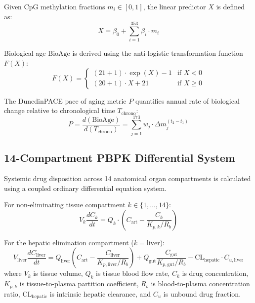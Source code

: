 \documentclass[10pt,journal,compsoc]{IEEEtran}
\begin{document}
Given CpG methylation fractions $m_i \in [0, 1]$, the linear predictor $X$ is defined as:
\begin{equation}
X = \beta_0 + \sum_{i=1}^{353} \beta_i \cdot m_i
\end{equation}

Biological age $\text{BioAge}$ is derived using the anti-logistic transformation function $F(X)$:
\begin{equation}
F(X) = \begin{cases} 
(21 + 1) \cdot \exp(X) - 1 & \text{if } X < 0 \\
(20 + 1) \cdot X + 21 & \text{if } X \ge 0 
\end{cases}
\end{equation}

The DunedinPACE pace of aging metric $P$ quantifies annual rate of biological change relative to chronological time $T_{\text{chrono}}$:
\begin{equation}
P = \frac{d(\text{BioAge})}{d(T_{\text{chrono}})} = \sum_{j=1}^{173} w_j \cdot \Delta m_j^{(t_2 - t_1)}
\end{equation}

\subsection{14-Compartment PBPK Differential System}
Systemic drug disposition across 14 anatomical organ compartments is calculated using a coupled ordinary differential equation system.

For non-eliminating tissue compartment $k \in \{1, \dots, 14\}$:
\begin{equation}
V_k \frac{dC_k}{dt} = Q_k \cdot \left( C_{\text{art}} - \frac{C_k}{K_{p,k} / R_b} \right)
\end{equation}

For the hepatic elimination compartment ($k = \text{liver}$):
\begin{equation}
V_{\text{liver}} \frac{dC_{\text{liver}}}{dt} = Q_{\text{liver}} \left( C_{\text{art}} - \frac{C_{\text{liver}}}{K_{p,\text{liver}} / R_b} \right) + Q_{\text{gut}} \frac{C_{\text{gut}}}{K_{p,\text{gut}} / R_b} - \text{CL}_{\text{hepatic}} \cdot C_{u,\text{liver}}
\end{equation}
where $V_k$ is tissue volume, $Q_k$ is tissue blood flow rate, $C_k$ is drug concentration, $K_{p,k}$ is tissue-to-plasma partition coefficient, $R_b$ is blood-to-plasma concentration ratio, $\text{CL}_{\text{hepatic}}$ is intrinsic hepatic clearance, and $C_{u}$ is unbound drug fraction.
\end{document}
